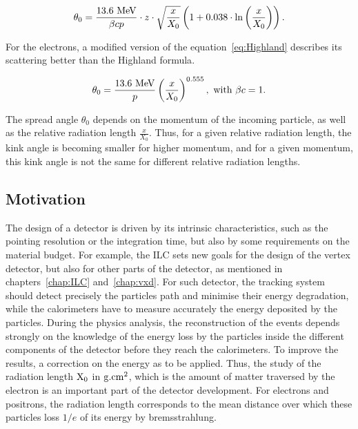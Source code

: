     \begin{equation}
      \theta_{0} = \frac{13.6~\rm{MeV}}{\beta c p}\cdot z \cdot \sqrt{\frac{x}{X_{0}}}\left(1 + 0.038 \cdot \ln{\left(\frac{x}{X_{0}}\right)}\right).
      \label{eq:Highland}
    \end{equation}

    For the electrons, a modified version of the equation~\ref{eq:Highland} describes its scattering better than the Highland formula\cite{GEANT4}.

    \begin{equation}
      \theta_{0} = \frac{13.6~\rm{MeV}}{p}\left(\frac{x}{X_{0}}\right)^{0.555},~\text{with $\beta c = 1$.}
      \label{eq:theta0}
    \end{equation}

    The spread angle $\theta_{0}$ depends on the momentum of the incoming particle, as well as the relative radiation length $\frac{x}{X_{0}}$.
    Thus, for a given relative radiation length, the kink angle is becoming smaller for higher momentum, and for a given momentum, this kink angle is not the same for different relative radiation lengths.

    \subsection{Motivation}

    The design of a detector is driven by its intrinsic characteristics, such as the pointing resolution or the integration time, but also by some requirements on the material budget.
    For example, the \gls{ILC} sets new goals for the design of the vertex detector, but also for other parts of the detector, as mentioned in chapters~\ref{chap:ILC} and~\ref{chap:vxd}.
    For such detector, the tracking system should detect precisely the particles path and minimise their energy degradation, while the calorimeters have to measure accurately the energy deposited by the particles.
    During the physics analysis, the reconstruction of the events depends strongly on the knowledge of the energy loss by the particles inside the different components of the detector before they reach the calorimeters. 
    To improve the results, a correction on the energy as to be applied.
    Thus, the study of the radiation length $\rm{X_{0}}$ in $\rm{g.cm}^{2}$, which is the amount of matter traversed by the electron is an important part of the detector development.
    For electrons and positrons, the radiation length corresponds to the mean distance over which these particles loss $1/e$ of its energy by bremsstrahlung.


